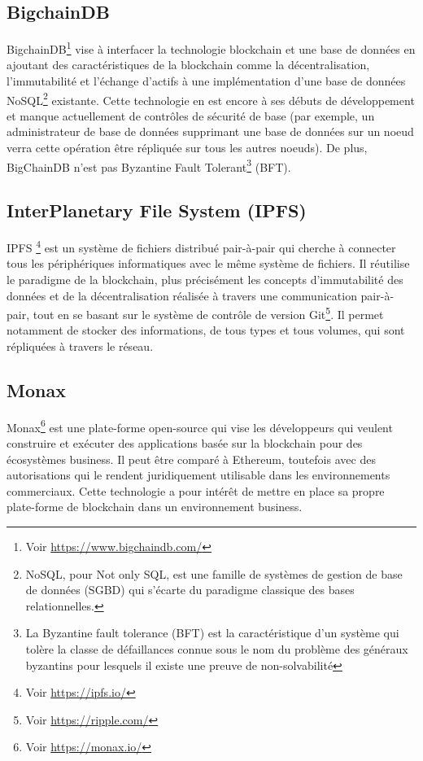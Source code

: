 \documentclass{tnreport}
\begin{document}
\subsection{BigchainDB}

BigchainDB\footnote{Voir \url{https://www.bigchaindb.com/}} vise à interfacer la technologie blockchain et une base de données en ajoutant des caractéristiques de la blockchain comme la décentralisation, l'immutabilité et l'échange d'actifs à une implémentation d'une base de données NoSQL\footnote{NoSQL, pour Not only SQL, est une famille de systèmes de gestion de base de données (SGBD) qui s'écarte du paradigme classique des bases relationnelles.} existante. Cette technologie en est encore à ses débuts de développement et manque actuellement de contrôles de sécurité de base (par exemple, un administrateur de base de données supprimant une base de données sur un noeud verra cette opération être répliquée sur tous les autres noeuds). De plus, BigChainDB n'est pas Byzantine Fault Tolerant\footnote{	La Byzantine fault tolerance (BFT) est la caractéristique d'un système qui tolère la classe de défaillances connue sous le nom du problème des généraux byzantins pour lesquels il existe une preuve de non-solvabilité} (BFT).

\subsection{InterPlanetary File System (IPFS)}

IPFS \footnote{Voir \url{https://ipfs.io/}} est un système de fichiers distribué pair-à-pair qui cherche à connecter tous les périphériques informatiques avec le même système de fichiers. Il réutilise le paradigme de la blockchain, plus précisément les concepts d'immutabilité des données et de la décentralisation réalisée à travers une communication pair-à-pair, tout en se basant sur le système de contrôle de version Git\footnote{Voir \url{https://ripple.com/}}. Il permet notamment de stocker des informations, de tous types et tous volumes, qui sont répliquées à travers le réseau. 

\subsection{Monax}

Monax\footnote{Voir \url{https://monax.io/}} est une plate-forme open-source qui vise les développeurs qui veulent construire et exécuter des applications basée sur la blockchain pour des écosystèmes business. Il peut être comparé à Ethereum, toutefois avec des autorisations qui le rendent juridiquement utilisable dans les environnements commerciaux. Cette technologie a pour intérêt de mettre en place sa propre plate-forme de blockchain dans un environnement business.
\end{document}

